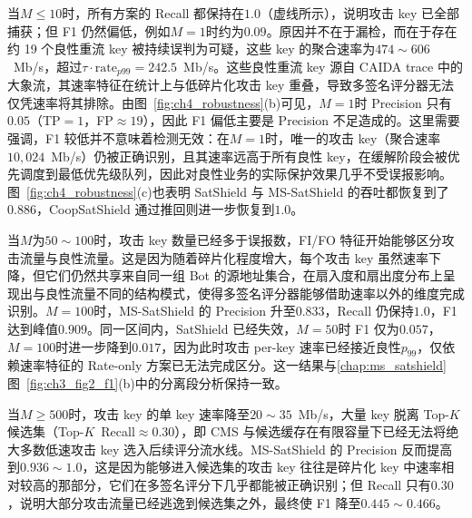 当$M\leq10$时，所有方案的 Recall 都保持在$1.0$（虚线所示），说明攻击 key 已全部捕获；但 F1 仍然偏低，例如$M=1$时约为$0.09$。原因并不在于漏检，而在于存在约 19 个良性重流 key 被持续误判为可疑，这些 key 的聚合速率为$474\sim606$~Mb/s，超过$\tau\cdot\text{rate}_{p99}=242.5$~Mb/s。这些良性重流 key 源自 CAIDA trace 中的大象流，其速率特征在统计上与低碎片化攻击 key 重叠，导致多签名评分器无法仅凭速率将其排除。由图~\ref{fig:ch4_robustness}(b)可见，$M=1$时 Precision 只有$0.05$（TP$=1$，FP$\approx19$），因此 F1 偏低主要是 Precision 不足造成的。这里需要强调，F1 较低并不意味着检测无效：在$M=1$时，唯一的攻击 key（聚合速率$10{,}024$~Mb/s）仍被正确识别，且其速率远高于所有良性 key，在缓解阶段会被优先调度到最低优先级队列，因此对良性业务的实际保护效果几乎不受误报影响。图~\ref{fig:ch4_robustness}(c)也表明 SatShield 与 MS-SatShield 的吞吐都恢复到了$0.886$，CoopSatShield 通过推回则进一步恢复到$1.0$。

当$M$为$50\sim100$时，攻击 key 数量已经多于误报数，FI/FO 特征开始能够区分攻击流量与良性流量。这是因为随着碎片化程度增大，每个攻击 key 虽然速率下降，但它们仍然共享来自同一组 Bot 的源地址集合，在扇入度和扇出度分布上呈现出与良性流量不同的结构模式，使得多签名评分器能够借助速率以外的维度完成识别。$M=100$时，MS-SatShield 的 Precision 升至$0.833$，Recall 仍保持$1.0$，F1 达到峰值$0.909$。同一区间内，SatShield 已经失效，$M=50$时 F1 仅为$0.057$，$M=100$时进一步降到$0.017$，因为此时攻击 per-key 速率已经接近良性$p_{99}$，仅依赖速率特征的 Rate-only 方案已无法完成区分。这一结果与\ref{chap:ms_satshield}图~\ref{fig:ch3_fig2_f1}(b)中的分离段分析保持一致。

当$M\geq500$时，攻击 key 的单 key 速率降至$20\sim35$~Mb/s，大量 key 脱离 Top-$K$ 候选集（Top-$K$~Recall$\approx0.30$），即 CMS 与候选缓存在有限容量下已经无法将绝大多数低速攻击 key 选入后续评分流水线。MS-SatShield 的 Precision 反而提高到$0.936\sim1.0$，这是因为能够进入候选集的攻击 key 往往是碎片化 key 中速率相对较高的那部分，它们在多签名评分下几乎都能被正确识别；但 Recall 只有$0.30$，说明大部分攻击流量已经逃逸到候选集之外，最终使 F1 降至$0.445\sim0.466$。

